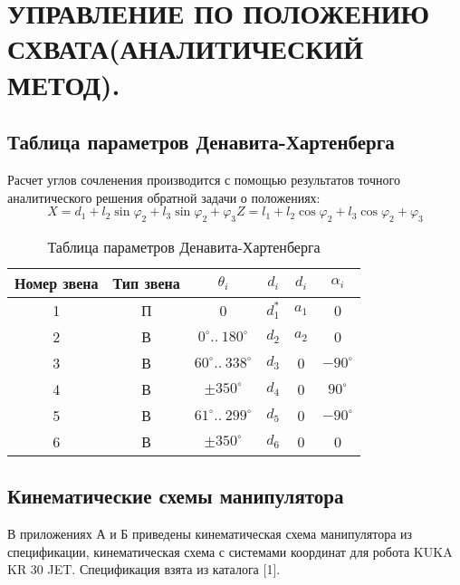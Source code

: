 \chapter{\MakeUppercase{Управление по положению схвата(аналитический метод). }}
\section{Таблица параметров Денавита-Хартенберга}
Расчет углов сочленения производится с помощью результатов точного аналитического решения обратной задачи о положениях:
\[ X=d_1+l_2\sin\varphi_2+l_3\sin{\varphi_2+\varphi_3}

Z=l_1+l_2\cos\varphi_2+l_3\cos{\varphi_2+\varphi_3}
    \]

\begin{table}[ht]
    \caption{Таблица параметров Денавита-Хартенберга}
    \label{table_dh}
    \centering
    \begin{tabular}{|c|c|c|c|c|c|}
    \hline Номер звена & Тип звена & $ \theta_i $ & $ d_i $ & $ d_i $ & $ \alpha_i $ \\
    \hline 1 & П & 0                            & $ d_{1}^{*} $ & $ a_1 $ & 0  \\
    \hline 2 & В & $ 0^\circ ..\: 180^\circ $   & $ d_2 $ & $ a_2 $ & 0 \\
    \hline 3 & В & $ 60^\circ ..\: 338^\circ $  & $ d_3 $ & 0 & $ -90^\circ $ \\
    \hline 4 & В & $ \pm 350^\circ $            & $ d_4 $ & 0 & $ 90^\circ $ \\
    \hline 5 & В & $ 61^\circ ..\: 299^\circ $  & $ d_5 $ & 0 & $ -90^\circ $ \\
    \hline 6 & В & $ \pm 350^\circ $            & $ d_6 $ & 0 & 0 \\
    \hline
    \end{tabular}
\end{table}

\section{Кинематические схемы манипулятора}

В приложениях А и Б приведены кинематическая схема манипулятора из спецификации, кинематическая схема с системами координат для робота KUKA KR 30 JET. Спецификация взята из каталога [1]. %

